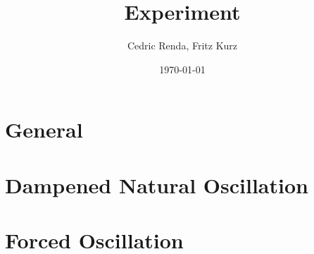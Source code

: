 \documentclass[12pt,a4paper]{article}
\title{Experiment}
\author{Cedric Renda, Fritz Kurz}
\date{\today }
\begin{document}
\maketitle


\tableofcontents

\section{General}



\section{Dampened Natural Oscillation}
%




\section{Forced Oscillation}
%






%
\newpage

\end{document}

